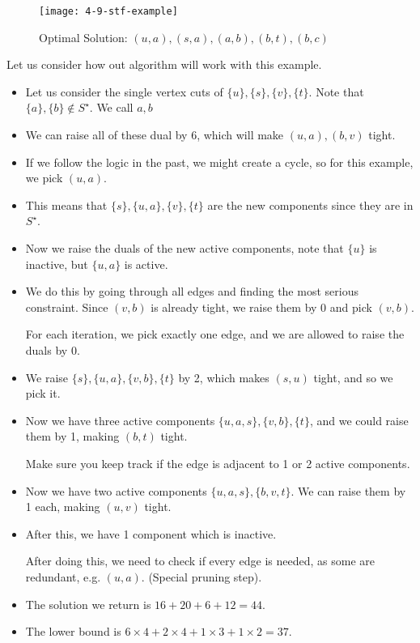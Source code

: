 \documentclass[../main/main.tex]{subfiles}
\begin{document}
\begin{figure}[h!]
	\centering
	\texttt{[image: 4-9-stf-example]}
	\caption{Optimal Solution: $(u,a),(s,a),(a,b),(b,t),(b,c)$}
\end{figure}
Let us consider how out algorithm will work with this example.
\begin{itemize}
	\item Let us consider the single vertex cuts of $\{u\} , \{s\} , \{v\} , \{t\} $. Note that $\{a\} , \{b\} \not\in S^\star$. We call $a,b$ 
	\item We can raise all of these dual by 6, which will make $(u,a), (b,v)$ tight.
	\item If we follow the logic in the past, we might create a cycle, so for this example, we pick $(u,a)$. 
	\item This means that $\{s\} ,\{u,a\} ,\{v\} ,\{t\} $ are the new  components since they are in $S^{\star}$. 
	\item Now we raise the duals of the new active components, note that $\{u\} $ is inactive, but $\{u,a\} $ is active.
	\item We do this by going through all edges and finding the most serious constraint. Since $(v,b)$ is already tight, we raise them by 0 and pick $(v,b)$.
		 \begin{remark}
			For each iteration, we pick exactly one edge, and we are allowed to raise the duals by 0.
		\end{remark}
	\item We raise $\{s\} , \{u,a\} , \{v,b\} , \{t\} $ by 2, which makes $(s,u)$ tight, and so we pick it.
	\item Now we have three active components $\{u,a,s\} ,  \{v,b\} , \{t\} $, and we could raise them by 1, making $(b,t)$ tight.
		\begin{remark}
			Make sure you keep track if the edge is adjacent to 1 or 2 active components.
		\end{remark}
	\item Now we have two active components $\{u,a,s\} ,\{b,v,t\} $. We can raise them by 1 each, making $(u,v)$ tight.
	\item After this, we have 1 component which is inactive.
\begin{remark}
	After doing this, we need to check if every edge is needed, as some are redundant, e.g. $(u,a)$. (Special pruning step).
\end{remark}
\item The solution we return is $16+20+6+12=44$. 
\item The lower bound is $6\times 4+2\times 4+1\times 3+1\times 2=37$.
\end{itemize}
\end{document}
